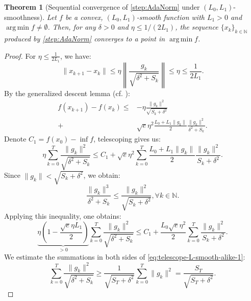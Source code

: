 \documentclass{article}
\theoremstyle{plain}
\newtheorem{theorem}{Theorem}
\theoremstyle{definition}
\theoremstyle{remark}
\newcommand{\N}{\mathbb{N}}
\newcommand{\argmin}{\operatorname{arg\,min}}
\newcommand*{\NN}{\mathbb{N}}
\begin{document}
\begin{theorem}[Sequential convergence of \ref{step:AdaNorm} under $(L_0,L_1)$-smoothness]
\label{thm:adanorm-main}
Let $f$ be a convex, $(L_0,L_1)$-smooth function with $L_1 > 0$ and $\argmin f \neq \emptyset$. Then, for any $\delta > 0$ and
$\eta \leq 1/(2L_1)$, the sequence $\{x_k\}_{k\in\N}$ produced by
\ref{step:AdaNorm} converges to a point in $\argmin f$.
\end{theorem}
\begin{proof}
For $\eta \leq \frac{1}{2L_1}$, we have:
\begin{equation*}
    \|x_{k + 1} - x_k\| \leq \eta\left\|\frac{g_k}{\sqrt{\delta^2 + S_k}}\right\| \leq \eta \leq \frac{1}{2L_1}.
\end{equation*}
By the generalized descent lemma (cf. ):
\begin{equation*}
    \begin{aligned}
        f(x_{k+1}) - f(x_k) \leq &- \eta \frac{\|g_k\|^2}{\sqrt{S_k + \delta^2}}\\ + &\sqrt{e}\eta^2\frac{L_0 + L_1\|g_k\|}{2}\frac{\|g_k\|^2}{\delta^2 + S_k}.
    \end{aligned}
\end{equation*}
Denote $C_1 = f(x_0) - \inf f$, telescoping gives us:
\begin{equation}
    \label{eq:telescope-adanorm-l0-l1}
    \eta \sum_{k = 0}^T \frac{\|g_k\|^2}{\sqrt{\delta^2 + S_k}} \leq C_1 + \sqrt{e}\eta^2 \sum_{k = 0}^T \frac{L_0 + L_1 \|g_k\|}{2} \frac{\|g_k\|^2}{S_k + \delta^2}.
\end{equation}
Since $\|g_k\| < \sqrt{S_k + \delta^2}$, we obtain:
\begin{equation*}
    \frac{\|g_k\|^3}{\delta^2 + S_k} \leq \frac{\|g_k\|^2}{\sqrt{S_k + \delta^2}}, \forall k \in \NN.
\end{equation*}
Applying this inequality, one obtains:
\begin{equation}
    \label{eq:telescope-L-smooth-alike-1}
    \underbrace{\eta\left(1 - \frac{\sqrt{e}\eta L_1}{2}\right)}_{>0} \sum_{k = 0}^T \frac{\|g_k\|^2}{\sqrt{\delta^2 + S_k}} \leq C_1 + \frac{L_0\sqrt{e}\eta^2}{2} \sum_{k = 0}^T \frac{\|g_k\|^2}{S_k + \delta^2}.
\end{equation}
We estimate the summations in both sides of \eqref{eq:telescope-L-smooth-alike-1}:
\begin{equation*}
    \sum_{k = 0}^T \frac{\|g_k\|^2}{\sqrt{\delta^2 + S_k}} \geq \frac{1}{\sqrt{S_T + \delta^2}}\sum_{k = 0}^T \|g_k\|^2 = \frac{S_T}{\sqrt{S_T + \delta^2}}.

\end{equation*}
\end{proof}
\end{document}
